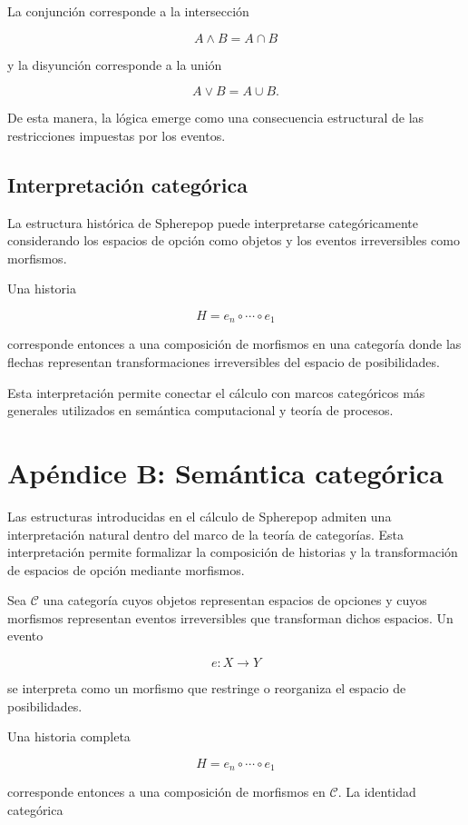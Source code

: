 \documentclass[12pt]{article}
\begin{document}
La conjunción corresponde a la intersección

\[
A \land B = A \cap B
\]

y la disyunción corresponde a la unión

\[
A \lor B = A \cup B .
\]

De esta manera, la lógica emerge como una consecuencia estructural de las restricciones impuestas por los eventos.

\subsection{Interpretación categórica}

La estructura histórica de Spherepop puede interpretarse categóricamente considerando los espacios de opción como objetos y los eventos irreversibles como morfismos.

Una historia

\[
H = e_n \circ \cdots \circ e_1
\]

corresponde entonces a una composición de morfismos en una categoría donde las flechas representan transformaciones irreversibles del espacio de posibilidades.

Esta interpretación permite conectar el cálculo con marcos categóricos más generales utilizados en semántica computacional y teoría de procesos.

\section{Apéndice B: Semántica categórica}

Las estructuras introducidas en el cálculo de Spherepop admiten una interpretación natural dentro del marco de la teoría de categorías. Esta interpretación permite formalizar la composición de historias y la transformación de espacios de opción mediante morfismos.

Sea \(\mathcal{C}\) una categoría cuyos objetos representan espacios de opciones y cuyos morfismos representan eventos irreversibles que transforman dichos espacios. Un evento

\[
e : X \rightarrow Y
\]

se interpreta como un morfismo que restringe o reorganiza el espacio de posibilidades.

Una historia completa

\[
H = e_n \circ \cdots \circ e_1
\]

corresponde entonces a una composición de morfismos en \(\mathcal{C}\). La identidad categórica
\end{document}
